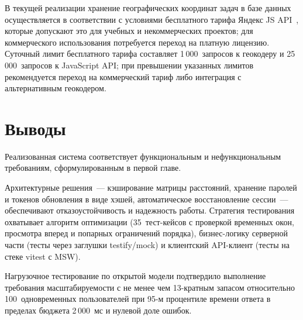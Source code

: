 В текущей реализации хранение географических координат задач в базе
данных осуществляется в соответствии с условиями бесплатного тарифа
Яндекс JS API~\cite{yandex_maps_js_api}, которые допускают это для
учебных и некоммерческих проектов; для коммерческого использования
потребуется переход на платную лицензию. Суточный лимит бесплатного
тарифа составляет 1\,000~запросов к геокодеру и 25\,000~запросов
к JavaScript API; при превышении указанных лимитов рекомендуется
переход на коммерческий тариф либо интеграция с альтернативным геокодером.

\section{Выводы}

Реализованная система соответствует функциональным и нефункциональным
требованиям, сформулированным в первой главе.

Архитектурные решения~--- кэширование матрицы расстояний, хранение
паролей и токенов обновления в виде хэшей, автоматическое восстановление
сессии~--- обеспечивают отказоустойчивость и надежность работы.
Стратегия тестирования охватывает алгоритм оптимизации (35~тест-кейсов
с проверкой временных окон, просмотра вперед и попарных ограничений
порядка), бизнес-логику серверной части (тесты через заглушки
testify/mock) и клиентский API-клиент (тесты на стеке
vitest с MSW).

Нагрузочное тестирование по открытой модели подтвердило выполнение требования
масштабируемости с не менее чем 13-кратным запасом относительно 100~одновременных
пользователей при 95-м процентиле времени ответа в пределах бюджета 2\,000~мс и
нулевой доле ошибок.
